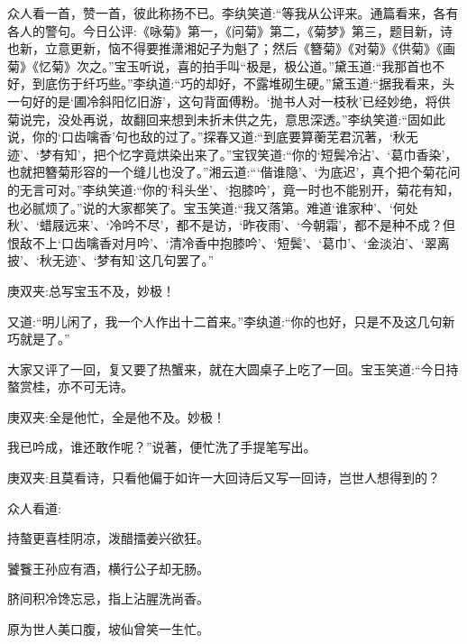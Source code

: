 \begin{parag}
    众人看一首，赞一首，彼此称扬不已。李纨笑道:“等我从公评来。通篇看来，各有各人的警句。今日公评:《咏菊》第一，《问菊》第二，《菊梦》第三，题目新，诗也新，立意更新，恼不得要推潇湘妃子为魁了；然后《簪菊》《对菊》《供菊》《画菊》《忆菊》次之。”宝玉听说，喜的拍手叫“极是，极公道。”黛玉道:“我那首也不好，到底伤于纤巧些。”李纨道:“巧的却好，不露堆砌生硬。”黛玉道:“据我看来，头一句好的是‘圃冷斜阳忆旧游’，这句背面傅粉。‘抛书人对一枝秋’已经妙绝，将供菊说完，没处再说，故翻回来想到未折未供之先，意思深透。”李纨笑道:“固如此说，你的‘口齿噙香’句也敌的过了。”探春又道:“到底要算蘅芜君沉著，‘秋无迹’、‘梦有知’，把个忆字竟烘染出来了。”宝钗笑道:“你的‘短鬓冷沾’、‘葛巾香染’，也就把簪菊形容的一个缝儿也没了。”湘云道:“‘偕谁隐’、‘为底迟’，真个把个菊花问的无言可对。”李纨笑道:“你的‘科头坐’、‘抱膝吟’，竟一时也不能别开，菊花有知，也必腻烦了。”说的大家都笑了。宝玉笑道:“我又落第。难道‘谁家种’、‘何处秋’、‘蜡屐远来’、‘冷吟不尽’，都不是访，‘昨夜雨’、‘今朝霜’，都不是种不成？但恨敌不上‘口齿噙香对月吟’、‘清冷香中抱膝吟’、‘短鬓’、‘葛巾’、‘金淡泊’、‘翠离披’、‘秋无迹’、‘梦有知’这几句罢了。”\begin{note}庚双夹:总写宝玉不及，妙极！\end{note}又道:“明儿闲了，我一个人作出十二首来。”李纨道:“你的也好，只是不及这几句新巧就是了。”
\end{parag}


\begin{parag}
    大家又评了一回，复又要了热蟹来，就在大圆桌子上吃了一回。宝玉笑道:“今日持螯赏桂，亦不可无诗。\begin{note}庚双夹:全是他忙，全是他不及。妙极！\end{note}我已吟成，谁还敢作呢？”说著，便忙洗了手提笔写出。\begin{note}庚双夹:且莫看诗，只看他偏于如许一大回诗后又写一回诗，岂世人想得到的？\end{note}众人看道:
\end{parag}


\begin{poem}
    \begin{pl}持螯更喜桂阴凉，泼醋擂姜兴欲狂。\end{pl}

    \begin{pl}饕餮王孙应有酒，横行公子却无肠。\end{pl}

    \begin{pl}脐间积冷馋忘忌，指上沾腥洗尚香。\end{pl}

    \begin{pl}原为世人美口腹，坡仙曾笑一生忙。\end{pl}


\end{poem}


